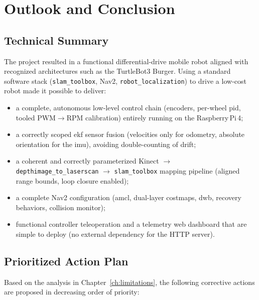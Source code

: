 \chapter{Outlook and Conclusion}
\label{ch:bilan}

\section{Technical Summary}
\label{sec:bilan_technique}

The \esibot{} project resulted in a functional differential-drive mobile robot aligned
with recognized architectures such as the TurtleBot3 Burger. Using a standard \ros{}
software stack (\texttt{slam\_toolbox}, Nav2, \texttt{robot\_localization}) to drive a
low-cost robot made it possible to deliver:

\begin{itemize}
	\item a complete, autonomous low-level control chain (encoders, per-wheel \gls{pid},
	      tooled PWM$\to$RPM calibration) entirely running on the Raspberry\,Pi\,4;
	\item a correctly scoped \gls{ekf} sensor fusion (velocities only for odometry,
	      absolute orientation for the \gls{imu}), avoiding double-counting of drift;
	\item a coherent and correctly parameterized Kinect $\to$ \texttt{depthimage\_to\_laserscan}
	      $\to$ \texttt{slam\_toolbox} mapping pipeline (aligned range bounds, loop
	      closure enabled);
	\item a complete Nav2 configuration (\gls{amcl}, dual-layer costmaps, \gls{dwb},
	      recovery behaviors, collision monitor);
	\item functional controller teleoperation and a telemetry web dashboard that are
	      simple to deploy (no external dependency for the HTTP server).
\end{itemize}

\section{Prioritized Action Plan}
\label{sec:bilan_plan}

Based on the analysis in Chapter~\ref{ch:limitations}, the following corrective actions
are proposed in decreasing order of priority:

